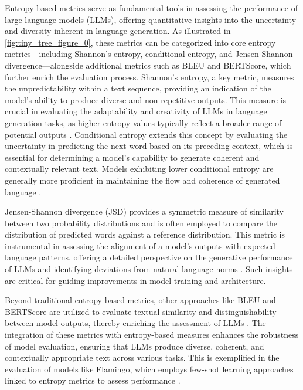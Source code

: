 Entropy-based metrics serve as fundamental tools in assessing the performance of large language models (LLMs), offering quantitative insights into the uncertainty and diversity inherent in language generation. As illustrated in \autoref{fig:tiny_tree_figure_0}, these metrics can be categorized into core entropy metrics—including Shannon's entropy, conditional entropy, and Jensen-Shannon divergence—alongside additional metrics such as BLEU and BERTScore, which further enrich the evaluation process. Shannon's entropy, a key metric, measures the unpredictability within a text sequence, providing an indication of the model's ability to produce diverse and non-repetitive outputs. This measure is crucial in evaluating the adaptability and creativity of LLMs in language generation tasks, as higher entropy values typically reflect a broader range of potential outputs \cite{wang2023environmenttransformerpolicyoptimization}. Conditional entropy extends this concept by evaluating the uncertainty in predicting the next word based on its preceding context, which is essential for determining a model's capability to generate coherent and contextually relevant text. Models exhibiting lower conditional entropy are generally more proficient in maintaining the flow and coherence of generated language \cite{moens2021efficientsemiimplicitvariationalinference}.

Jensen-Shannon divergence (JSD) provides a symmetric measure of similarity between two probability distributions and is often employed to compare the distribution of predicted words against a reference distribution. This metric is instrumental in assessing the alignment of a model's outputs with expected language patterns, offering a detailed perspective on the generative performance of LLMs and identifying deviations from natural language norms \cite{moens2021efficientsemiimplicitvariationalinference}. Such insights are critical for guiding improvements in model training and architecture.

Beyond traditional entropy-based metrics, other approaches like BLEU and BERTScore are utilized to evaluate textual similarity and distinguishability between model outputs, thereby enriching the assessment of LLMs \cite{yamshchikov2020styletransferparaphraselookingsensible}. The integration of these metrics with entropy-based measures enhances the robustness of model evaluation, ensuring that LLMs produce diverse, coherent, and contextually appropriate text across various tasks. This is exemplified in the evaluation of models like Flamingo, which employs few-shot learning approaches linked to entropy metrics to assess performance \cite{alayrac2022flamingo}.


